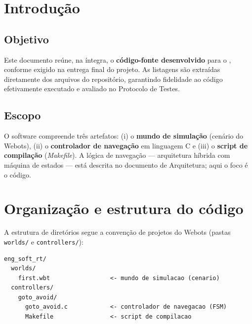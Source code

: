 
\newcommand{\tipodoc}{Código-Fonte}
\newcommand{\datadoc}{9 de julho de 2026}



\fazcapa
\controleversoes
\tableofcontents
\newpage

\section{Introdução}
\subsection{Objetivo}
Este documento reúne, na íntegra, o \textbf{código-fonte desenvolvido} para o \emph{\projnome}, conforme exigido na entrega final do projeto. As listagens são extraídas diretamente dos arquivos do repositório, garantindo fidelidade ao código efetivamente executado e avaliado no Protocolo de Testes.

\subsection{Escopo}
O software compreende três artefatos: (i) o \textbf{mundo de simulação} (cenário do Webots), (ii) o \textbf{controlador de navegação} em linguagem C e (iii) o \textbf{script de compilação} (\emph{Makefile}). A lógica de navegação --- arquitetura híbrida com máquina de estados --- está descrita no documento de Arquitetura; aqui o foco é o código.

\section{Organização e estrutura do código}
A estrutura de diretórios segue a convenção de projetos do Webots (pastas \texttt{worlds/} e \texttt{controllers/}):

\begin{lstlisting}[style=plain,numbers=none]
eng_soft_rt/
  worlds/
    first.wbt                 <- mundo de simulacao (cenario)
  controllers/
    goto_avoid/
      goto_avoid.c            <- controlador de navegacao (FSM)
      Makefile                <- script de compilacao
\end{lstlisting}

